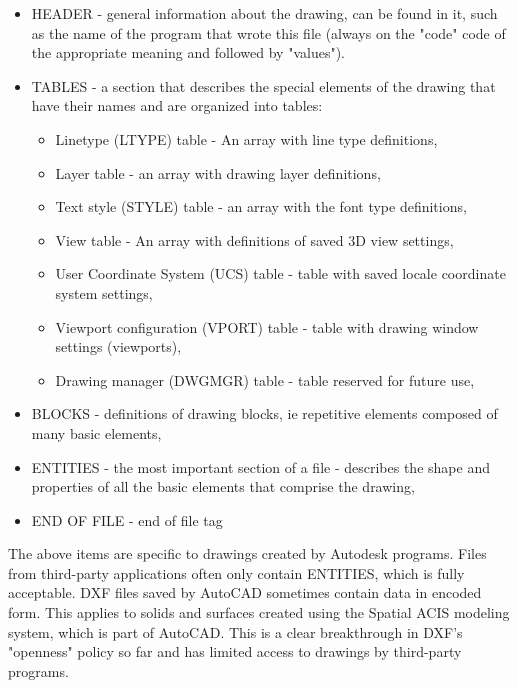 \documentclass[a4paper, 11pt, article]{report}
\begin{document}
\begin{itemize}
\item HEADER - general information about the drawing, can be found in it, such as the name of the program that wrote this file (always on the "code" code of the appropriate meaning and followed by "values").
\item TABLES - a section that describes the special elements of the drawing that have their names and are organized into tables:

\begin{itemize}
\item Linetype (LTYPE) table - An array with line type definitions,
\item Layer table - an array with drawing layer definitions,
\item Text style (STYLE) table - an array with the font type definitions,
\item View table - An array with definitions of saved 3D view settings,
\item User Coordinate System (UCS) table - table with saved locale coordinate system settings,
\item Viewport configuration (VPORT) table - table with drawing window settings (viewports),
\item Drawing manager (DWGMGR) table - table reserved for future use,
\end{itemize}

\item BLOCKS - definitions of drawing blocks, ie repetitive elements composed of many basic elements,
\item ENTITIES - the most important section of a file - describes the shape and properties of all the basic elements that comprise the drawing,
\item END OF FILE - end of file tag
\end{itemize}

The above items are specific to drawings created by Autodesk programs. Files from third-party applications often only contain ENTITIES, which is fully acceptable.
DXF files saved by AutoCAD sometimes contain data in encoded form. This applies to solids and surfaces created using the Spatial ACIS modeling system, which is part of AutoCAD. This is a clear breakthrough in DXF's "openness" policy so far and has limited access to drawings by third-party programs.
   
\end{document}
